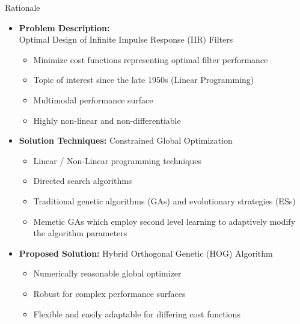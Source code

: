\documentclass[
	style=aggie,
	mode=present,
	size=10pt,
	paper=screen,
	orient=landscape,
	display=slides,
]{powerdot}
\begin{document}
\begin{slide}{Rationale}
	\begin{small}
 	\begin{itemize}[type=1]
  		\item \textbf{Problem Description:}\\ Optimal Design of Infinite Impulse Response
			  (IIR) Filters
		\begin{itemize}
			\item Minimize cost functions representing optimal filter performance
			\item Topic of interest since the late 1950s (Linear Programming)
			\item Multimodal performance surface
			\item Highly non-linear and non-differentiable \pause
		\end{itemize}
  		\item \textbf{Solution Techniques:} Constrained Global Optimization
  		\begin{itemize}
  			\item Linear / Non-Linear programming techniques
  			\item Directed search algorithms
  			\item Traditional genetic algorithms (GAs) and evolutionary strategies 
				  (ESs)
			\item Memetic GAs which employ second level learning to adaptively modify the
				  algorithm parameters \pause
  		\end{itemize}
  		\item \textbf{Proposed Solution:} Hybrid Orthogonal Genetic (HOG) Algorithm 
  		\begin{itemize}
  			\item Numerically reasonable global optimizer
  			\item Robust for complex performance surfaces
  			\item Flexible and easily adaptable for differing cost functions
  		\end{itemize}	
 	\end{itemize}
 	\end{small}
\end{slide}
\end{document}
